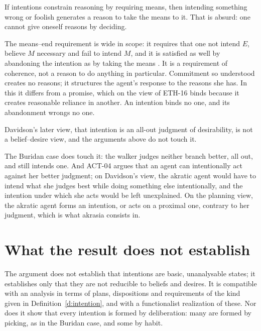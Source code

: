 \documentclass{situationist-preprint}
\begin{document}
\begin{objection}[Bootstrapping]
If intentions constrain reasoning by requiring means, then intending something wrong or foolish generates a reason to take the means to it. That is absurd: one cannot give oneself reasons by deciding.
\end{objection}

\begin{reply}
The means--end requirement is wide in scope: it requires that one not intend $E$, believe $M$ necessary and fail to intend $M$, and it is satisfied as well by abandoning the intention as by taking the means \citep{Broome1999}. It is a requirement of coherence, not a reason to do anything in particular. Commitment so understood creates no reasons; it structures the agent's response to the reasons she has. In this it differs from a promise, which on the view of ETH-16 binds because it creates reasonable reliance in another. An intention binds no one, and its abandonment wrongs no one.
\end{reply}

\begin{objection}
Davidson's later view, that intention is an all-out judgment of desirability, is not a belief--desire view, and the arguments above do not touch it.
\end{objection}

\begin{reply}
The Buridan case does touch it: the walker judges neither branch better, all out, and still intends one. And ACT-04 argues that an agent can intentionally act against her better judgment; on Davidson's view, the akratic agent would have to intend what she judges best while doing something else intentionally, and the intention under which she acts would be left unexplained. On the planning view, the akratic agent forms an intention, or acts on a proximal one, contrary to her judgment, which is what akrasia consists in.
\end{reply}

\section{What the result does not establish}

The argument does not establish that intentions are basic, unanalysable states; it establishes only that they are not reducible to beliefs and desires. It is compatible with an analysis in terms of plans, dispositions and requirements of the kind given in Definition~\ref{d:intention}, and with a functionalist realization of these. Nor does it show that every intention is formed by deliberation: many are formed by picking, as in the Buridan case, and some by habit.
\end{document}

